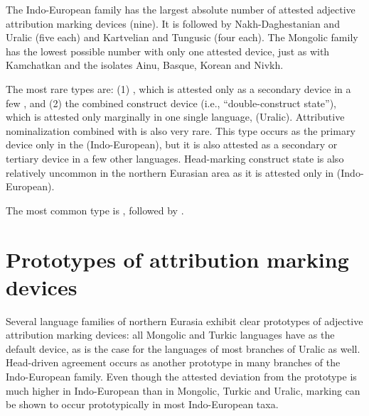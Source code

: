 The Indo-European family has the largest absolute number of attested adjective attribution marking devices (nine). It is followed by Nakh\hyp{}Daghestanian and Uralic (five each) and Kartvelian and Tungusic (four each). The Mongolic family has the lowest possible number with only one attested device, just as with Kamchatkan and the isolates Ainu, Basque, Korean and Nivkh.

The most rare types are: (1) , which is attested only as a secondary device in a few , and (2) the combined construct device (i.e., “double\hyp{}construct state”), which is attested only marginally in one single language,  (Uralic). Attributive nominalization combined  with  is also very rare. This type occurs as the primary device only in the  (Indo-European), but it is also attested as a secondary or tertiary device in a few other languages. Head-marking construct state is also relatively uncommon in the northern Eurasian area as it is attested only in  (Indo-European).

The most common type is , followed by .

\section{Prototypes of attribution marking devices}
Several language families of northern Eurasia exhibit clear prototypes of adjective attribution marking devices: all Mongolic and Turkic languages have  as the default device, as is the case for the languages of most branches of Uralic as well. Head\hyp{}driven agreement occurs as another prototype in many branches of the Indo-European family. Even though the attested deviation from the prototype is much higher in Indo-European than in Mongolic, Turkic and Uralic,  marking can be shown to occur prototypically in most Indo-European taxa.

